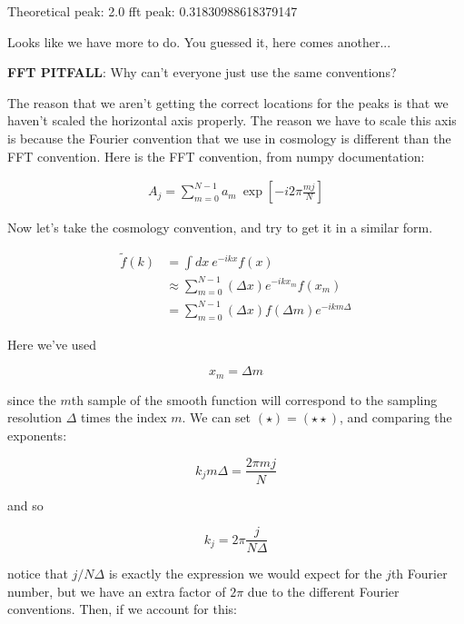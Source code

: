 \documentclass[a4paper]{article}
\newenvironment{colbox}[1]
  {\newcommand\colboxcolor{#1}%
   \begin{lrbox}{\selvestebox}%
   \begin{minipage}{\dimexpr\columnwidth-2\fboxsep\relax}}
  {\end{minipage}\end{lrbox}%
   \begin{center}
   \colorbox[HTML]{\colboxcolor}{\usebox{\selvestebox}}
   \end{center}}
\begin{document}
\begin{pyprint}
Theoretical peak:  2.0
fft peak:  0.31830988618379147

\end{pyprint} 

Looks like we have more to do. You guessed it, here comes another... 


\begin{colbox}{F8E0E0}
    \textbf{FFT PITFALL}: Why can't everyone just use the same conventions?
\end{colbox}

The reason that we aren't getting the correct locations for the peaks is that we haven't scaled the horizontal axis properly. The reason we have to scale this axis is because the Fourier convention that we use in cosmology is different than the FFT convention. Here is the FFT convention, from numpy documentation:

\begin{align*}
    A_j = \sum_{m=0}^{N-1} a_m \ \exp[-i2\pi \frac{mj}{N}] \tag{$\star$}
\end{align*}

Now let's take the cosmology convention, and try to get it in a similar form. 

\begin{align*}
    \tilde{f}(k) &= \int dx \ e^{-ikx} f(x) \\
    &\approx \sum_{m=0}^{N-1} (\Delta x) e^{-ikx_m}f(x_m) \\
    &= \sum_{m=0}^{N-1} (\Delta x) f(\Delta m) e^{-ikm\Delta} \tag{$\star \star$}
\end{align*} 

Here we've used 

\begin{equation*}
    x_m = \Delta m
\end{equation*}

since the $m$th sample of the smooth function will correspond to the sampling resolution $\Delta$ times the index $m$. We can set $(\star) = (\star \star)$, and comparing the exponents:

\begin{equation*}
    k_j m \Delta = \frac{2\pi m j}{N}
\end{equation*}

and so 

\begin{equation*}
    k_j = 2\pi \frac{j}{N\Delta}
\end{equation*}

notice that $j / N \Delta$ is exactly the expression we would expect for the $j$th Fourier number, but we have an extra factor of $2\pi$ due to the different Fourier conventions. Then, if we account for this:
\end{document}
